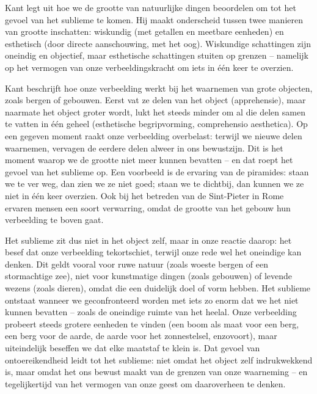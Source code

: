 \begin{mdframed}[leftmargin=0pt,rightmargin=0pt,backgroundcolor=blue!6,linecolor=white,innertopmargin=6pt,innerbottommargin=6pt]

Kant legt uit hoe we de grootte van natuurlijke dingen beoordelen om tot het gevoel van het sublieme te komen. Hij maakt onderscheid tussen twee manieren van grootte inschatten: wiskundig (met getallen en meetbare eenheden) en esthetisch (door directe aanschouwing, met het oog). Wiskundige schattingen zijn oneindig en objectief, maar esthetische schattingen stuiten op grenzen – namelijk op het vermogen van onze verbeeldingskracht om iets in één keer te overzien.

Kant beschrijft hoe onze verbeelding werkt bij het waarnemen van grote objecten, zoals bergen of gebouwen. Eerst vat ze delen van het object (apprehensie), maar naarmate het object groter wordt, lukt het steeds minder om al die delen samen te vatten in één geheel (esthetische begripvorming, comprehensio aesthetica). Op een gegeven moment raakt onze verbeelding overbelast: terwijl we nieuwe delen waarnemen, vervagen de eerdere delen alweer in ons bewustzijn. Dit is het moment waarop we de grootte niet meer kunnen bevatten – en dat roept het gevoel van het sublieme op. Een voorbeeld is de ervaring van de piramides: staan we te ver weg, dan zien we ze niet goed; staan we te dichtbij, dan kunnen we ze niet in één keer overzien. Ook bij het betreden van de Sint-Pieter in Rome ervaren mensen een soort verwarring, omdat de grootte van het gebouw hun verbeelding te boven gaat.

Het sublieme zit dus niet in het object zelf, maar in onze reactie daarop: het besef dat onze verbeelding tekortschiet, terwijl onze rede wel het oneindige kan denken. Dit geldt vooral voor ruwe natuur (zoals woeste bergen of een stormachtige zee), niet voor kunstmatige dingen (zoals gebouwen) of levende wezens (zoals dieren), omdat die een duidelijk doel of vorm hebben. Het sublieme ontstaat wanneer we geconfronteerd worden met iets zo enorm dat we het niet kunnen bevatten – zoals de oneindige ruimte van het heelal. Onze verbeelding probeert steeds grotere eenheden te vinden (een boom als maat voor een berg, een berg voor de aarde, de aarde voor het zonnestelsel, enzovoort), maar uiteindelijk beseffen we dat elke maatstaf te klein is. Dat gevoel van ontoereikendheid leidt tot het sublieme: niet omdat het object zelf indrukwekkend is, maar omdat het ons bewust maakt van de grenzen van onze waarneming – en tegelijkertijd van het vermogen van onze geest om daaroverheen te denken.


\end{mdframed}
